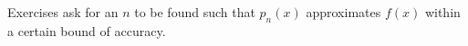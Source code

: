 {\noindent Exercises}
{ ask for an $n$ to be found such that $p_n(x)$ approximates $f(x)$ within a certain bound of accuracy.
}

